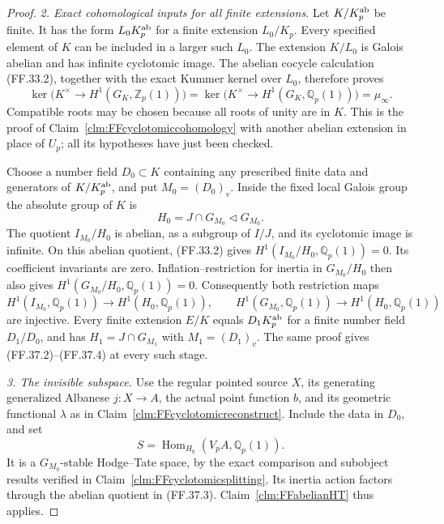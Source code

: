 \begin{proof}
\emph{2. Exact cohomological inputs for all finite extensions.}
Let \(K/K_p^{\rm ab}\) be finite.
It has the form \(L_0K_p^{\rm ab}\)
for a finite extension \(L_0/K_p\).
Every specified element of \(K\)
can be included in a larger such
\(L_0\). The extension \(K/L_0\)
is Galois abelian and has infinite
cyclotomic image. The abelian cocycle
calculation (FF.33.2), together with
the exact Kummer kernel over \(L_0\),
therefore proves
\[
 \ker\bigl(K^\times\to H^1(G_K,\mathbb Z_p(1))\bigr)
 =\ker\bigl(K^\times\to H^1(G_K,\mathbb Q_p(1))\bigr)
 =\mu_\infty.
                                                        \tag{FF.37.2}
\]
Compatible roots may be chosen because
all roots of unity are in \(K\).
This is the proof of
Claim~\ref{clm:FFcyclotomiccohomology}
with another abelian extension in
place of \(U_p\); all its hypotheses
have just been checked.

Choose a number field \(D_0\subset K\)
containing any prescribed finite data
and generators of \(K/K_p^{\rm ab}\),
and put \(M_0=(D_0)_v\). Inside the
fixed local Galois group the absolute
group of \(K\) is
\[
            H_0=J\cap G_{M_0}
                         \triangleleft G_{M_0}.
                                                        \tag{FF.37.3}
\]
The quotient \(I_{M_0}/H_0\) is
abelian, as a subgroup of \(I/J\),
and its cyclotomic image is infinite.
On this abelian quotient, (FF.33.2)
gives \(H^1(I_{M_0}/H_0,\mathbb Q_p(1))=0\).
Its coefficient invariants are zero.
Inflation--restriction for inertia
in \(G_{M_0}/H_0\) then also gives
\(H^1(G_{M_0}/H_0,\mathbb Q_p(1))=0\).
Consequently both restriction maps
\[
 H^1(I_{M_0},\mathbb Q_p(1))\longrightarrow H^1(H_0,\mathbb Q_p(1)),
 \qquad
 H^1(G_{M_0},\mathbb Q_p(1))\longrightarrow H^1(H_0,\mathbb Q_p(1))
                                                        \tag{FF.37.4}
\]
are injective. Every finite extension
\(E/K\) equals \(D_1K_p^{\rm ab}\)
for a finite number field \(D_1/D_0\),
and has \(H_1=J\cap G_{M_1}\) with
\(M_1=(D_1)_v\). The same proof gives
(FF.37.2)--(FF.37.4) at every such stage.

\emph{3. The invisible subspace.}
Use the regular pointed source \(X\),
its generating generalized Albanese
\(j:X\to A\), the actual point function
\(b\), and its geometric functional
\(\lambda\) as in
Claim~\ref{clm:FFcyclotomicreconstruct}.
Include the data in \(D_0\), and set
\[
                   S=\operatorname{Hom}_{H_0}
                                (V_pA,\mathbb Q_p(1)).
                                                        \tag{FF.37.5}
\]
It is a \(G_{M_0}\)-stable Hodge--Tate
space, by the exact comparison and
subobject results verified in
Claim~\ref{clm:FFcyclotomicsplitting}.
Its inertia action factors through
the abelian quotient in (FF.37.3).
Claim~\ref{clm:FFabelianHT} thus applies.


\end{proof}
